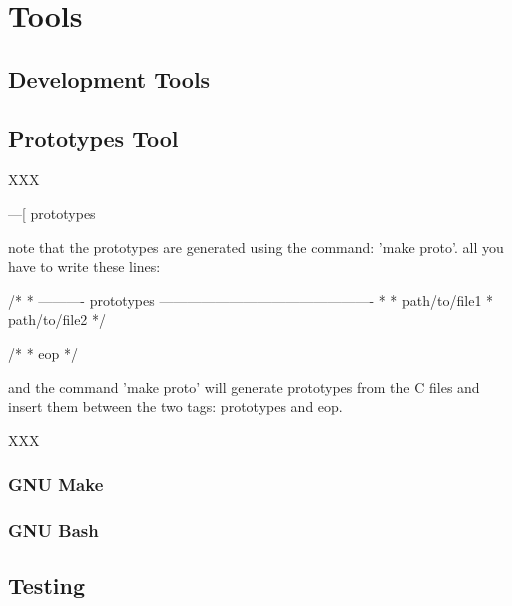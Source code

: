 
%
%

\chapter{Tools}

%
%

\section{Development Tools}

%
%

\section{Prototypes Tool}

XXX

---[ prototypes

  note that the prototypes are generated using the command: 'make proto'.
  all you have to write these lines:

        /*
         * ---------- prototypes ----------------------------------------------
         *
         *      path/to/file1
         *      path/to/file2
         */

        /*
         * eop
         */

  and the command 'make proto' will generate prototypes from the C files
  and insert them between the two tags: prototypes and eop.

XXX

%
%

\subsection{GNU Make}

%
%

\subsection{GNU Bash}

%
%

\section{Testing}

